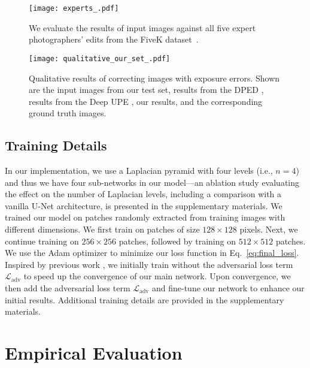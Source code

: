 \documentclass[final]{cvpr}
\begin{document}
\begin{figure}[t]
\centering
\texttt{[image: experts\_.pdf]}
\vspace{-6mm}
\caption{We evaluate the results of input images against all five expert photographers' edits from the FiveK dataset~\cite{fivek}.\vspace{-4mm}}
\label{fig:experts}
\end{figure}

\begin{figure*}
\centering
\texttt{[image: qualitative\_our\_set\_.pdf]}
\vspace{-7mm}
\caption{Qualitative results of correcting images with exposure errors. Shown are the input images from our test set, results from the DPED \cite{DPED}, results from the Deep UPE \cite{DPE}, our results, and the corresponding ground truth images.\vspace{-2mm}}
\label{fig:qualitative_our_set}
\end{figure*}


\subsection{Training Details}\label{subsec:training_details}

In our implementation, we use a Laplacian pyramid with four levels (i.e., $n=4$) and thus we have four sub-networks in our model---an ablation study evaluating the effect on the
number of Laplacian levels, including a comparison with a vanilla U-Net architecture, is presented in the supplementary materials. We trained our model on patches randomly extracted from training images with different dimensions. We first train on patches of size $128\!\times\!128$ pixels. Next, we continue training on $256\!\times\!256$ patches, followed by training on $512\!\times\!512$ patches. We use the Adam optimizer \cite{kingma2014adam} to minimize our loss function in Eq.\ \ref{eq:final_loss}.
Inspired by previous work \cite{ma2017pose}, we initially train
 without the adversarial loss term $\mathcal{L}_{\text{adv}}$ to speed up the convergence of our main network. Upon convergence, we then add the adversarial loss term $\mathcal{L}_{\text{adv}}$
 and fine-tune our network to enhance our initial results. Additional training details are provided  in the supplementary materials.




\section{Empirical Evaluation} \label{sec:results}
\end{document}
